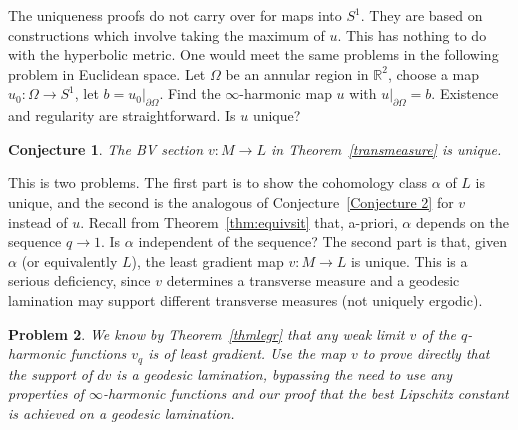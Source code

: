 \documentclass{ip-journal}
\newtheorem{theorem}{Theorem}[section]
\newtheorem{problem}[theorem]{Problem}
\newtheorem{conjecture}[theorem]{Conjecture}
\theoremstyle{definition}
\numberwithin{equation}{section}
\newcommand{\R}{\mathbb R}
\begin{document}
The uniqueness proofs do not carry over for maps into $S^1$.  They are based on constructions which involve taking the maximum of $u$. This has nothing to do with the hyperbolic metric. One would meet the same problems in the following problem in Euclidean space.
Let $\Omega$ be an annular region in $\R^2$, choose a map $u_0: \Omega \rightarrow S^1$, let $b =u_0 \big |_{\partial \Omega}$.  Find the $\infty$-harmonic map $u$ with $u \big |_{\partial \Omega}=b$.   Existence and regularity are straightforward. Is $u$ unique?


\begin{conjecture}\label{Conjecture 3}  The  BV section $v: M \rightarrow L$ in Theorem~\ref{transmeasure}  is unique.
\end{conjecture}

 This is two problems. The first part is to show the cohomology class $\alpha$ of $L$ is unique, and the second is the analogous of Conjecture~\ref{Conjecture 2} for $v$ instead of $u$. Recall from Theorem~\ref{thm:equivsit}  that,  a-priori, $\alpha$ depends on the sequence  $q \rightarrow 1$. Is $\alpha$ independent of the sequence? The second part is that, given $\alpha$ (or equivalently $L$), the least gradient map $v: M \rightarrow L$ is unique. This is a serious deficiency, since $v$ determines a transverse measure and a geodesic lamination may support different transverse measures (not uniquely ergodic).

\begin{problem}\label{Problem 5}
 We know by Theorem~\ref{thmlegr} that any weak limit $v$ of the $q$-harmonic functions $v_q$ is of least gradient. Use the map $v$ to prove directly  that the support of $dv$ is a geodesic lamination, bypassing the need to use any properties of $\infty$-harmonic functions and our proof that the best Lipschitz constant is achieved on a geodesic lamination. 
  \end{problem}
  
%  
\end{document}
